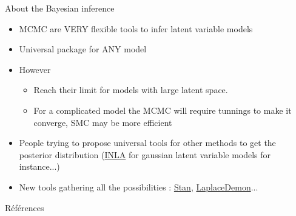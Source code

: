 \documentclass[compress,10pt]{beamer}
\def \vert{\color{dgreen}}
\def \noir{\color{black}}
\begin{document}
 
 \begin{frame}{About the Bayesian inference}
  
  \begin{itemize}
  \item MCMC are VERY flexible tools to infer latent variable models
  \item Universal package for ANY model
  \item \vert However \noir
  \begin{itemize}
  \item Reach their limit for models with large latent space. 
  \item For a complicated model the MCMC will  require tunnings to make it converge, SMC may be more efficient
  \end{itemize}
  
  \item People trying to propose universal tools for other methods to get the posterior distribution (\href{https://www.r-inla.org/}{\textcolor{dgreen}{INLA}}  for gaussian latent variable models for instance...) 
  \item New tools  gathering all the possibilities :  \href{https://mc-stan.org/}{Stan}, \href{https://cran.r-project.org/web/packages/LaplacesDemon/index.html}{LaplaceDemon}...
  \end{itemize}
  
  
 \end{frame}

 



\begin{frame}[allowframebreaks=0.90]{Références}

 \small{}
  \end{frame}
  
  
  
\end{document}
